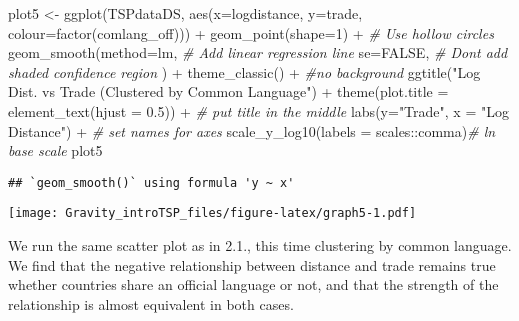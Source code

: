 \documentclass[
]{article}
\newenvironment{Shaded}{\begin{snugshade}}{\end{snugshade}}
\newcommand{\AttributeTok}[1]{\textcolor[rgb]{0.77,0.63,0.00}{#1}}
\newcommand{\CommentTok}[1]{\textcolor[rgb]{0.56,0.35,0.01}{\textit{#1}}}
\newcommand{\ConstantTok}[1]{\textcolor[rgb]{0.00,0.00,0.00}{#1}}
\newcommand{\DecValTok}[1]{\textcolor[rgb]{0.00,0.00,0.81}{#1}}
\newcommand{\FloatTok}[1]{\textcolor[rgb]{0.00,0.00,0.81}{#1}}
\newcommand{\FunctionTok}[1]{\textcolor[rgb]{0.00,0.00,0.00}{#1}}
\newcommand{\NormalTok}[1]{#1}
\newcommand{\OtherTok}[1]{\textcolor[rgb]{0.56,0.35,0.01}{#1}}
\newcommand{\SpecialCharTok}[1]{\textcolor[rgb]{0.00,0.00,0.00}{#1}}
\newcommand{\StringTok}[1]{\textcolor[rgb]{0.31,0.60,0.02}{#1}}
\begin{document}
\begin{Shaded}
\begin{Highlighting}[]
\NormalTok{plot5 }\OtherTok{\textless{}{-}} \FunctionTok{ggplot}\NormalTok{(TSPdataDS, }\FunctionTok{aes}\NormalTok{(}\AttributeTok{x=}\NormalTok{logdistance,}
                         \AttributeTok{y=}\NormalTok{trade, }\AttributeTok{colour=}\FunctionTok{factor}\NormalTok{(comlang\_off))) }\SpecialCharTok{+}
                        \FunctionTok{geom\_point}\NormalTok{(}\AttributeTok{shape=}\DecValTok{1}\NormalTok{) }\SpecialCharTok{+} \CommentTok{\# Use hollow circles}
                        \FunctionTok{geom\_smooth}\NormalTok{(}\AttributeTok{method=}\NormalTok{lm, }\CommentTok{\# Add linear regression line}
                                \AttributeTok{se=}\ConstantTok{FALSE}\NormalTok{,   }\CommentTok{\# Don\textquotesingle{}t add shaded confidence region}
\NormalTok{                                ) }\SpecialCharTok{+} 
                        \FunctionTok{theme\_classic}\NormalTok{() }\SpecialCharTok{+} \CommentTok{\#no background}
                        \FunctionTok{ggtitle}\NormalTok{(}\StringTok{"Log Dist. vs Trade (Clustered by Common Language"}\NormalTok{) }\SpecialCharTok{+}
                        \FunctionTok{theme}\NormalTok{(}\AttributeTok{plot.title =} \FunctionTok{element\_text}\NormalTok{(}\AttributeTok{hjust =} \FloatTok{0.5}\NormalTok{)) }\SpecialCharTok{+} \CommentTok{\# put title in the middle}
                        \FunctionTok{labs}\NormalTok{(}\AttributeTok{y=}\StringTok{"Trade"}\NormalTok{, }\AttributeTok{x =} \StringTok{"Log Distance"}\NormalTok{) }\SpecialCharTok{+} \CommentTok{\# set names for axes}
                        \FunctionTok{scale\_y\_log10}\NormalTok{(}\AttributeTok{labels =}\NormalTok{ scales}\SpecialCharTok{::}\NormalTok{comma)}\CommentTok{\# ln base scale}
\NormalTok{plot5}
\end{Highlighting}
\end{Shaded}

\begin{verbatim}
## `geom_smooth()` using formula 'y ~ x'
\end{verbatim}

\texttt{[image: Gravity\_introTSP\_files/figure-latex/graph5-1.pdf]}

We run the same scatter plot as in 2.1., this time clustering by common
language. We find that the negative relationship between distance and
trade remains true whether countries share an official language or not,
and that the strength of the relationship is almost equivalent in both
cases.
\end{document}
